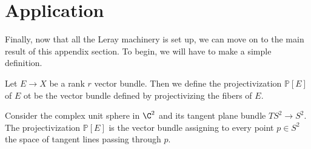 \documentclass[11pt]{amsart}
\renewcommand{\P}{\mathbb{P}}
\begin{document}
\section{Application}
Finally, now that all the Leray machinery is set up, we can move on to the main result of this appendix section. To begin, we will have to make a simple definition.
\begin{definition}
Let $E\to X$ be a rank $r$ vector bundle. Then we define the projectivization $\P[E]$ of $E$ ot be the vector bundle defined by projectivizing the fibers of $E$. 
\end{definition}

\begin{example}
      Consider the complex unit sphere in $\C^2$ and its tangent plane bundle $TS^2\to S^2$. The projectivization $\P[E]$ is the vector bundle assigning to every point $p \in S^2$ the space of tangent lines passing through $p$.
\end{example}
\end{document}
